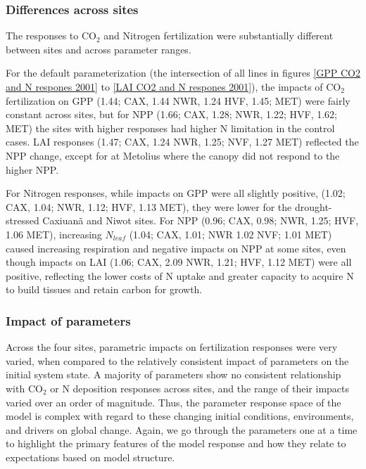 \documentclass[draft,linenumbers]{agujournal}
\begin{document}
\subsubsection{Differences across sites}
The responses to CO$_{2}$ and Nitrogen fertilization were substantially different between sites and across parameter ranges. 

For the default parameterization (the intersection of all lines in figures \ref{GPP CO2 and N respones 2001} to \ref{LAI CO2 and N respones 2001}), the impacts of CO$_{2}$ fertilization on  GPP (1.44; CAX, 1.44 NWR, 1.24 HVF, 1.45; MET) were fairly constant across sites, but for NPP (1.66; CAX, 1.28; NWR, 1.22; HVF, 1.62; MET) the sites with higher responses had higher N limitation in the control cases.  LAI responses (1.47; CAX, 1.24 NWR, 1.25; NVF, 1.27 MET) reflected the NPP change, except for at Metolius where the canopy did not respond to the higher NPP. 

For Nitrogen responses, while impacts on  GPP were all slightly positive, (1.02; CAX, 1.04; NWR, 1.12; HVF, 1.13 MET), they were lower for the drought-stressed Caxiuan\~a and Niwot sites.  For NPP (0.96; CAX, 0.98; NWR, 1.25; HVF, 1.06 MET), increasing $N_{leaf}$ (1.04; CAX, 1.01; NWR 1.02 NVF; 1.01 MET) caused increasing respiration and negative impacts on NPP at some sites, even though impacts on LAI (1.06; CAX, 2.09 NWR, 1.21; HVF, 1.12 MET) were all positive, reflecting the lower costs of N uptake and greater capacity to acquire N to build tissues and retain carbon for growth.  

\subsubsection{Impact of parameters}
Across the four sites, parametric impacts on fertilization responses were very varied, when compared to the relatively consistent impact of parameters on the initial system state. A majority of parameters show no consistent relationship with CO$_{2}$ or N deposition responses across sites, and the range of their impacts varied over an order of magnitude. Thus, the parameter response space of the model is complex with regard to these changing initial conditions, environments, and drivers on global change. Again, we go through the parameters one at a time to highlight the primary features of the model response and how they relate to expectations based on model structure. 
\end{document}

